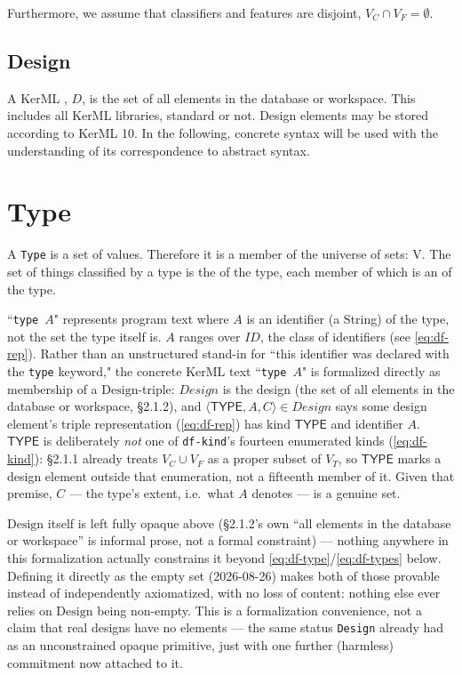 \pn Furthermore, we assume that classifiers and features are disjoint, $V_C \cap V_F = \emptyset$.

\subsection{Design}

\pn A KerML , $D$, 
is the set of all elements in the database or workspace.  This includes all KerML libraries, standard or not.
 Design elements may be stored according to KerML 10.  In the following, concrete syntax will be used with the understanding of its correspondence to abstract syntax.


\section{Type}

\pn A \texttt{Type} is a set of values.  Therefore it is a member of the universe of sets:  $\mathrm{V}$.
The set of things classified by a type is the  of the type, each
member of which is an  of the type.

\pn ``\texttt{type}~$A$" represents program text where $A$ is an identifier (a String) of the
type, not the set the type itself is.  $A$ ranges over $ID$, the class of identifiers (see
\ref{eq:df-rep}).  Rather than an unstructured stand-in for ``this identifier was declared with
the \texttt{type} keyword," the concrete KerML text ``\texttt{type}~$A$" is formalized directly as
membership of a $\mathrm{Design}$-triple: $Design$ is the design (the set of all elements in the
database or workspace, \S2.1.2), and $\langle \mathsf{TYPE}, A, C \rangle \in Design$ says some
design element's triple representation (\ref{eq:df-rep}) has kind $\mathsf{TYPE}$ and identifier
$A$.  $\mathsf{TYPE}$ is deliberately \emph{not} one of \texttt{df-kind}'s fourteen enumerated
kinds (\ref{eq:df-kind}): \S2.1.1 already treats $V_C \cup V_F$ as a proper subset of $V_T$, so
$\mathsf{TYPE}$ marks a design element outside that enumeration, not a fifteenth member of it.
Given that premise, $C$ --- the type's extent, i.e.\ what $A$ denotes --- is a genuine set.

\pn $\mathrm{Design}$ itself is left fully opaque above (\S2.1.2's own ``all elements in the
database or workspace'' is informal prose, not a formal constraint) --- nothing anywhere in this
formalization actually constrains it beyond \ref{eq:df-type}/\ref{eq:df-types} below. Defining it
directly as the empty set (2026-08-26) makes both of those provable instead of independently
axiomatized, with no loss of content: nothing else ever relies on $\mathrm{Design}$ being
non-empty. This is a formalization convenience, not a claim that real designs have no
elements --- the same status \texttt{Design} already had as an unconstrained opaque primitive,
just with one further (harmless) commitment now attached to it.

